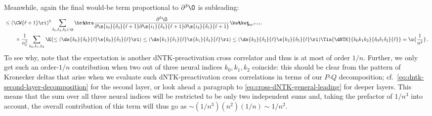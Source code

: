 Meanwhile, again the final would-be term proportional to $\partial^3\O$ is subleading:
\begin{align}
&\le(\CW{\ell+1}\ri)^3\sum_{\delta_3,\delta_4,\delta_5\in\D}\bra\!\!\!\bra\frac{\partial^3 \O}{\partial \z{i_0}{\delta_3}{\ell+1}\partial \z{i_1}{\delta_4}{\ell+1}\partial \z{i_2}{\delta_5}{\ell+1}} \ket\!\!\!\ket_{\!\!\!\ker^{(\ell+1)}}\, \\
&\quad\quad\times\frac{1}{n_{\ell}^3}\sum_{k_0,k_1,k_2}\E{\le(\ds{k_0}{\delta_0}{\ell}\s{k_0}{\delta_3}{\ell}\ri)\le(\ds{k_1}{\delta_1}{\ell}\s{k_1}{\delta_4}{\ell} \ri)\le(\ds{k_2}{\delta_2}{\ell}\s{k_2}{\delta_5}{\ell}\ri)\Tia{\dNTK}{k_0k_1k_2}{\delta_0\delta_1\delta_2}{\ell}} = \o{\frac{1}{n^2}} \, \notag .
\end{align}
To see why, note that the expectation is another dNTK-preactivation cross correlator and thus is at most of order $1/n$. 
Further, we only get such an order-$1/n$ contribution  when two out of three neural indices $k_0, k_1, k_2$ coincide: this should be clear from the pattern of Kronecker deltas that arise when we evaluate such dNTK-preactivation cross correlations in terms of our 
$P$-$Q$ decomposition; cf.~\eqref{eq:dntk-second-layer-decomposition} for the second layer, or look ahead a paragraph to \eqref{eq:cross-dNTK-general-leading} for deeper layers.
This means that the sum over all three neural indices will be restricted to be only two independent sums and, taking the prefactor of $1/n^3$ into account, the overall contribution of this term will thus go as $\sim(1/n^3)(n^2)(1/n)\sim 1/n^2$.






